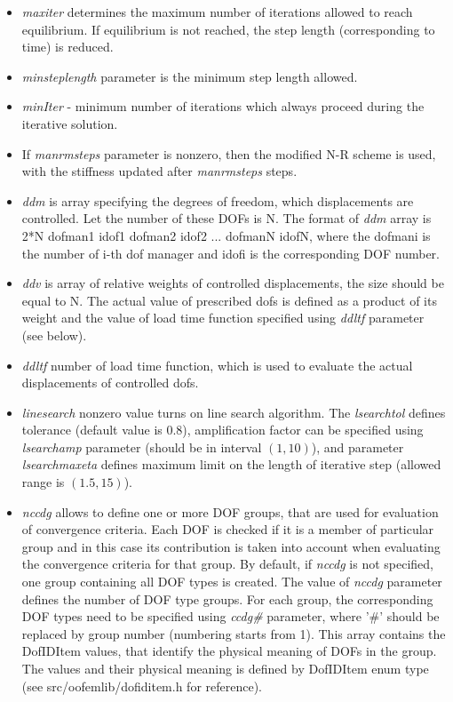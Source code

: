 \documentclass[a4paper]{article}
\newcommand{\param}[1]{{\em #1}}
\begin{document}
\begin{itemize}
\item \param{maxiter} determines the maximum
number of iterations allowed to reach equilibrium. If equilibrium is
not reached, the step length (corresponding to time) is reduced.
\item \param{minsteplength} parameter is the minimum step length
allowed.
\item \param{minIter} - minimum number of iterations which always proceed during the iterative solution.
\item If \param{manrmsteps} parameter is nonzero, then the modified
N-R scheme is used, with the stiffness updated after
\param{manrmsteps} steps.
\item \param{ddm} is array specifying the degrees of freedom,
which displacements are controlled.
Let the number of these DOFs is N.
The format of \param{ddm} array is 2*N dofman1 idof1
dofman2 idof2 ... dofmanN idofN, where the dofmani is the number of i-th dof manager  and idofi is the
corresponding DOF number.
\item \param{ddv} is array of relative weights of controlled
displacements, the size should be equal to N. The actual value of
prescribed dofs is defined as a product of its weight and the value of
load time function specified using \param{ddltf} parameter (see
below).
\item \param{ddltf} number of load time function, which is used to
evaluate the actual displacements of controlled dofs.
\item \param {linesearch} nonzero value turns on line search
  algorithm. The \param{lsearchtol} defines tolerance (default value
  is 0.8), amplification
  factor can be specified using \param{lsearchamp} parameter (should
  be in interval $(1,10)$), and parameter \param{lsearchmaxeta}
  defines maximum limit on the length of iterative step (allowed range
  is $(1.5,15)$).
\item \param{nccdg} allows to define one or more DOF groups, that are used for evaluation of convergence criteria. Each DOF is checked if it is a member of particular group and in this case its contribution is taken into account when evaluating the convergence criteria for that group. By default, if \param{nccdg} is not specified, one group containing all DOF types is created. The value of \param{nccdg} parameter defines the number of DOF type groups. For each group, the corresponding DOF types need to be specified using \param{ccdg\#} parameter, where '\#' should be replaced by group number (numbering starts from 1). This array contains the DofIDItem values, that identify the physical meaning of DOFs in the group. The values and their physical meaning is defined by DofIDItem enum type (see src/oofemlib/dofiditem.h for reference).

\end{itemize}
\end{document}
